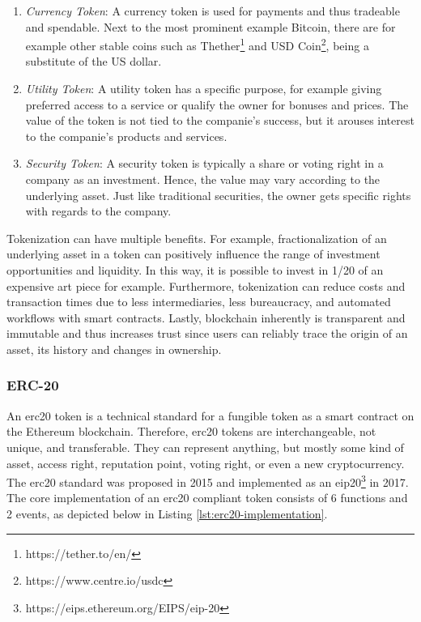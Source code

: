 \begin{enumerate}
    \item \emph{Currency Token}: A currency token is used for payments and thus tradeable and spendable. Next to the most prominent example Bitcoin, there are for example other stable coins such as Thether\footnote{https://tether.to/en/} and USD Coin\footnote{https://www.centre.io/usdc}, being a substitute of the US dollar. 
    \item \emph{Utility Token}: A utility token has a specific purpose, for example giving preferred access to a service or qualify the owner for bonuses and prices. The value of the token is not tied to the companie's success, but it arouses interest to the companie's products and services.
    \item \emph{Security Token}: A security token is typically a share or voting right in a company as an investment. Hence, the value may vary according to the underlying asset. Just like traditional securities, the owner gets specific rights with regards to the company.
\end{enumerate}

Tokenization can have multiple benefits. For example, fractionalization of an underlying asset in a token can positively influence the range of investment opportunities and liquidity. In this way, it is possible to invest in 1/20 of an expensive art piece for example. Furthermore, tokenization can reduce costs and transaction times due to less intermediaries, less bureaucracy, and automated workflows with smart contracts. Lastly, blockchain inherently is transparent and immutable and thus increases trust since users can reliably trace the origin of an asset, its history and changes in ownership. 

\subsubsection{ERC-20}
\label{subsubsec:erc20}

An \acrfull{erc20} token is a technical standard for a fungible token as a smart contract on the Ethereum blockchain. Therefore, \acrshort{erc20} tokens are interchangeable, not unique, and transferable. They can represent anything, but mostly some kind of asset, access right, reputation point, voting right, or even a new cryptocurrency. The \acrshort{erc20} standard was proposed in 2015 and implemented as an \acrfull{eip20}\footnote{https://eips.ethereum.org/EIPS/eip-20} in 2017. The core implementation of an \acrshort{erc20} compliant token consists of 6 functions and 2 events, as depicted below in Listing \ref{lst:erc20-implementation}.\vspace{3mm}

